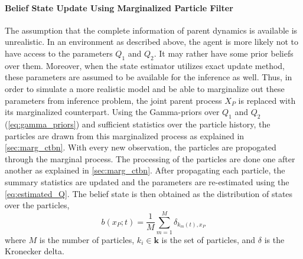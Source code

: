 \paragraph*{Belief State Update Using Marginalized Particle Filter}
\label{par:bs_partFilt}
The assumption that the complete information of parent dynamics is available is unrealistic. In an environment as described above, the agent is more likely not to have access to the parameters $ Q_1 $ and $ Q_2 $. It may rather have some prior beliefs over them. Moreover, when the state estimator utilizes exact update method, these parameters are assumed to be available for the inference as well. Thus, in order to simulate a more realistic model and be able to marginalize out these parameters from inference problem, the joint parent process $ X_P $ is replaced with its marginalized counterpart. Using the Gamma-priors over $ Q_1 $ and $ Q_2 $ (\autoref{eq:gamma_priors}) and sufficient statistics over the particle history, the particles are drawn from this marginalized process as explained in \cref{sec:marg_ctbn}. With every new observation, the particles are propogated through the marginal process. The processing of the particles are done one after another as explained in \cref{sec:marg_ctbn}. After propagating each particle, the summary statistics are updated and the parameters are re-estimated using the \autoref{eq:estimated_Q}. The belief state is then obtained as the distribution of states over the particles,
\begin{equation}
b(x_P; t) = \frac{1}{M} \sum_{m=1}^{M} \delta_{k_m(t), x_P}
\label{eq:belief_over_particles}
\end{equation}
where $ M $ is the number of particles, $ k_i \in \textbf{k} $ is the set of particles, and $\delta$ is the Kronecker delta.

